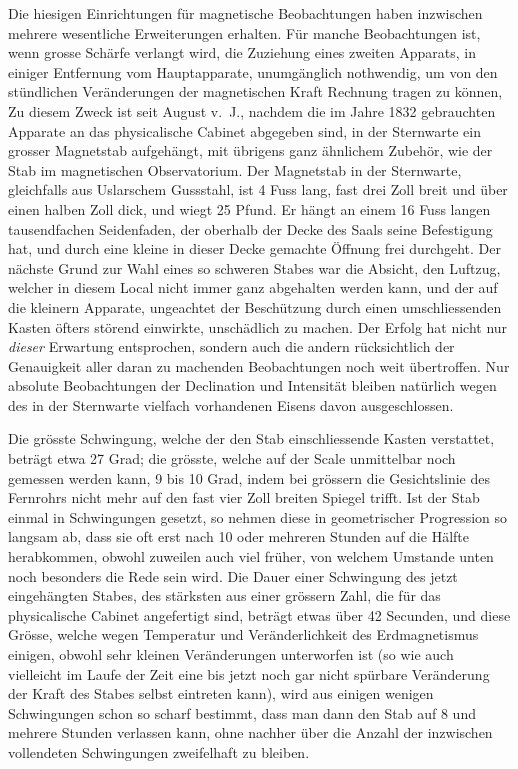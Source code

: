 Die hiesigen Einrichtungen für magnetische Beobachtungen haben inzwischen mehrere wesentliche Erweiterungen erhalten. Für manche Beobachtungen ist, wenn grosse Schärfe verlangt wird, die Zuziehung eines zweiten Apparats, in einiger Entfernung vom Hauptapparate, unumgänglich nothwendig, um von den stündlichen Veränderungen der magnetischen Kraft Rechnung tragen zu können, Zu diesem Zweck ist seit August v.\ J., nachdem die im Jahre 1832 gebrauchten Apparate an das physicalische Cabinet abgegeben sind, in der Sternwarte ein grosser Magnetstab aufgehängt, mit übrigens ganz ähnlichem Zubehör, wie der Stab im magnetischen Observatorium. Der Magnetstab in der Sternwarte, gleichfalls aus Uslarschem Gussstahl, ist 4 Fuss lang, fast drei Zoll breit und über einen halben Zoll dick, und wiegt 25 Pfund. Er hängt an einem 16 Fuss langen tausendfachen Seidenfaden, der oberhalb der Decke des Saals seine Befestigung hat, und durch eine kleine in dieser Decke gemachte Öffnung frei durchgeht. Der nächste Grund zur Wahl eines so schweren Stabes war die Absicht, den Luftzug, welcher in diesem Local nicht immer ganz abgehalten werden kann, und der auf die kleinern Apparate, ungeachtet der Beschützung durch einen umschliessenden Kasten öfters störend einwirkte, unschädlich zu machen. Der Erfolg hat nicht nur \textit{dieser} Erwartung entsprochen, sondern auch die andern rücksichtlich der Genauigkeit aller daran zu machenden Beobachtungen noch weit übertroffen. Nur absolute Beobachtungen der Declination und Intensität bleiben natürlich wegen des in der Sternwarte vielfach vorhandenen Eisens davon ausgeschlossen.

Die grösste Schwingung, welche der den Stab einschliessende Kasten verstattet, beträgt etwa 27 Grad; die grösste, welche auf der Scale unmittelbar noch gemessen werden kann, 9 bis 10 Grad, indem bei grössern die Gesichtslinie des Fernrohrs nicht mehr auf den fast vier Zoll breiten Spiegel trifft. Ist der Stab einmal in Schwingungen gesetzt, so nehmen diese in geometrischer Progression so langsam ab, dass sie oft erst nach 10 oder mehreren Stunden auf die Hälfte herabkommen, obwohl zuweilen auch viel früher, von welchem Umstande unten noch besonders die Rede sein wird. Die Dauer einer Schwingung des jetzt eingehängten Stabes, des stärksten aus einer grössern Zahl, die für das physicalische Cabinet angefertigt sind, beträgt etwas über 42 Secunden, und diese Grösse, welche wegen Temperatur und Veränderlichkeit des Erdmagnetismus einigen, obwohl sehr kleinen Veränderungen unterworfen ist (so wie auch vielleicht im Laufe der Zeit eine bis jetzt noch gar nicht spürbare Veränderung der Kraft des Stabes selbst eintreten kann), wird aus einigen wenigen Schwingungen schon so scharf bestimmt, dass man dann den Stab auf 8 und mehrere Stunden verlassen kann, ohne nachher über die Anzahl der inzwischen vollendeten Schwingungen zweifelhaft zu bleiben.


